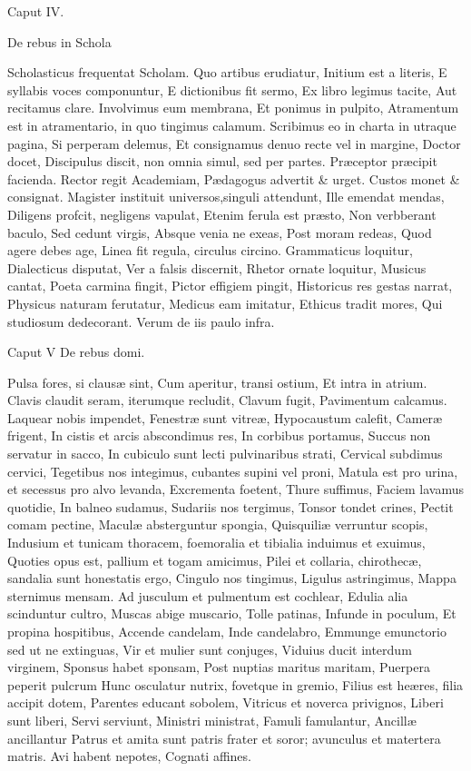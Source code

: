 \documentclass{book}
\begin{document}
Caput IV.

De rebus in Schola

Scholasticus frequentat Scholam.
Quo artibus erudiatur,
Initium est a literis,
E syllabis voces componuntur,
E dictionibus fit sermo,
Ex libro legimus tacite,
Aut recitamus clare.
Involvimus eum membrana,
Et ponimus in pulpito,
Atramentum est in atramentario, in quo tingimus calamum.
Scribimus eo in charta in utraque pagina,
Si perperam delemus,
Et consignamus denuo recte vel in margine,
Doctor docet,
Discipulus discit, non omnia simul, sed per partes.
Præceptor præcipit facienda.
Rector regit Academiam,
Pædagogus advertit & urget.
Custos monet & consignat.
Magister instituit universos,singuli attendunt,
Ille emendat mendas,
Diligens profcit, negligens vapulat,
Etenim ferula est præsto,
Non verbberant baculo,
Sed cedunt virgis,
Absque venia ne exeas,
Post moram redeas,
Quod agere debes age,
Linea fit regula, circulus circino.
Grammaticus loquitur,
Dialecticus disputat,
Ver a falsis discernit,
Rhetor ornate loquitur,
Musicus cantat,
Poeta carmina fingit,
Pictor effigiem pingit,
Historicus res gestas narrat,
Physicus naturam ferutatur,
Medicus eam imitatur,
Ethicus tradit mores,
Qui studiosum dedecorant.
Verum de iis paulo infra.


Caput V
De rebus domi.

Pulsa fores, si clausæ sint,
Cum aperitur, transi ostium,
Et intra in atrium.
Clavis claudit seram, iterumque recludit,
Clavum fugit,
Pavimentum calcamus. 
Laquear nobis impendet,
Fenestræ sunt vitreæ,
Hypocaustum calefit,
Cameræ frigent,
In cistis et arcis abscondimus res,
In corbibus portamus,
Succus non servatur in sacco,
In cubiculo sunt lecti pulvinaribus strati, 
Cervical subdimus cervici,
Tegetibus nos integimus, cubantes supini vel proni,
Matula est pro urina, et secessus pro alvo levanda,
Excrementa foetent,
Thure suffimus,
Faciem lavamus quotidie,
In balneo sudamus,
Sudariis nos tergimus,
Tonsor tondet crines,
Pectit comam pectine,
Maculæ absterguntur spongia,
Quisquiliæ verruntur scopis,
Indusium et tunicam thoracem, foemoralia et tibialia induimus et exuimus,
Quoties opus est, pallium et togam amicimus,
Pilei et collaria, chirothecæ, sandalia sunt honestatis ergo,
Cingulo nos tingimus,
Ligulus astringimus,
Mappa sternimus mensam.
Ad jusculum et pulmentum est cochlear,
Edulia alia scinduntur cultro,
Muscas abige muscario,
Tolle patinas,
Infunde in poculum,
Et propina hospitibus,
Accende candelam,
Inde candelabro,
Emmunge emunctorio sed ut ne extinguas,
Vir et mulier sunt conjuges,
Viduius ducit interdum virginem,
Sponsus habet sponsam,
Post nuptias maritus maritam,
Puerpera peperit pulcrum
Hunc osculatur nutrix, fovetque in gremio,
Filius est heæres, filia accipit dotem,
Parentes educant sobolem,
Vitricus et noverca privignos,
Liberi sunt liberi,
Servi serviunt,
Ministri ministrat,
Famuli famulantur,
Ancillæ ancillantur
Patrus et amita sunt patris frater et soror; avunculus et matertera matris.
Avi habent nepotes,
Cognati affines.
\end{document}
